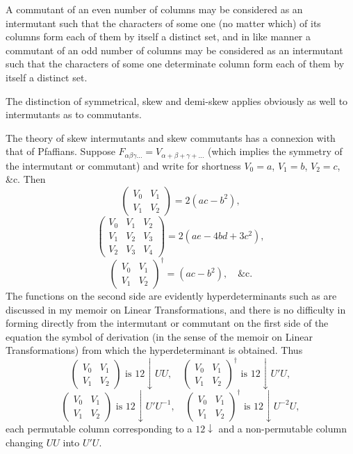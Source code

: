 \documentclass[11pt,a4paper]{article}
\theoremstyle{plain}
\begin{document}
A commutant of an even number of columns may be considered as an intermutant such that the characters of some one (no matter which) of its columns form each of them by itself a distinct set, and in like manner a commutant of an odd number of columns may be considered as an intermutant such that the characters of some one determinate column form each of them by itself a distinct set.

The distinction of symmetrical, skew and demi-skew applies obviously as well to intermutants as to commutants.

The theory of skew intermutants and skew commutants has a connexion with that of Pfaffians. Suppose $F_{\alpha\beta\gamma\ldots} = V_{\alpha+\beta+\gamma+\ldots}$ (which implies the symmetry of the intermutant or commutant) and write for shortness $V_0 = a$, $V_1 = b$, $V_2 = c$, \&c. Then
\[\begin{pmatrix} V_0 & V_1 \\ V_1 & V_2 \end{pmatrix} = 2(ac - b^2),\]
\[\begin{pmatrix} V_0 & V_1 & V_2 \\ V_1 & V_2 & V_3 \\ V_2 & V_3 & V_4 \end{pmatrix} = 2(ae - 4bd + 3c^2),\]
\[\begin{pmatrix} V_0 & V_1 \\ V_1 & V_2 \end{pmatrix}^{\dagger} = (ac - b^2), \quad \&\text{c.}\]
The functions on the second side are evidently hyperdeterminants such as are discussed in my memoir on Linear Transformations, and there is no difficulty in forming directly from the intermutant or commutant on the first side of the equation the symbol of derivation (in the sense of the memoir on Linear Transformations) from which the hyperdeterminant is obtained. Thus
\[\begin{pmatrix} V_0 & V_1 \\ V_1 & V_2 \end{pmatrix} \text{ is } 12\downarrow UU, \quad \begin{pmatrix} V_0 & V_1 \\ V_1 & V_2 \end{pmatrix}^{\dagger} \text{ is } 12\downarrow U'U,\]
\[\begin{pmatrix} V_0 & V_1 \\ V_1 & V_2 \end{pmatrix} \text{ is } 12\downarrow U'U^{-1}, \quad \begin{pmatrix} V_0 & V_1 \\ V_1 & V_2 \end{pmatrix}^{\dagger} \text{ is } 12\downarrow U^{-2}U,\]
each permutable column corresponding to a $12\downarrow$ and a non-permutable column changing $UU$ into $U'U$.
\end{document}
